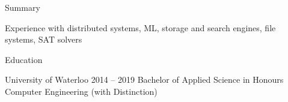 \documentclass{resume} %
\begin{document}

\begin{rSection}{Summary}
  \begin{rSummarySection}
  {
    \item Experience with distributed systems, ML, storage and search engines,
      file systems, SAT solvers
  }
  \end{rSummarySection}
\end{rSection}


\begin{rSection}{Education}
  \begin{rEducationSection}{University of Waterloo}
                           {2014 -- 2019}
                           {Bachelor of Applied Science in Honours Computer Engineering (with Distinction)}
  \end{rEducationSection}
\end{rSection}

\end{document}
